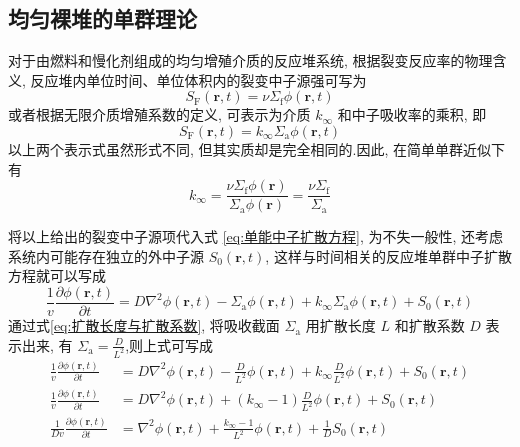\documentclass{Sichuan Normal University}
\begin{document}
\subsection{均匀裸堆的单群理论}
对于由燃料和慢化剂组成的均匀增殖介质的反应堆系统, 根据裂变反应率的物理含义, 反应堆内单位时间、单位体积内的裂变中子源强可写为
\begin{equation}
S_{\mathrm{F}}(\boldsymbol{r}, t)=\nu \Sigma_{\mathrm{f}} \phi(\boldsymbol{r}, t)
\end{equation}
或者根据无限介质增殖系数的定义, 可表示为介质 $k_{\infty}$ 和中子吸收率的乘积, 即
\begin{equation}
S_{\mathrm{F}}(\boldsymbol{r}, t)=k_{\infty} \Sigma_{\mathrm{a}} \phi(\boldsymbol{r}, t)
\end{equation}
以上两个表示式虽然形式不同, 但其实质却是完全相同的.因此, 在简单单群近似下有
\begin{equation}
k_{\infty}=\frac{\nu \Sigma_{\mathrm{f}} \phi(\boldsymbol{r})}{\Sigma_{\mathrm{a}} \phi(\boldsymbol{r})}=\frac{\nu \Sigma_{\mathrm{f}}}{\Sigma_{\mathrm{a}}}
\end{equation}

将以上给出的裂变中子源项代入式 \eqref{eq:单能中子扩散方程}, 为不失一般性, 还考虑系统内可能存在独立的外中子源 $S_0(\boldsymbol{r}, t)$, 这样与时间相关的反应堆单群中子扩散方程就可以写成
\begin{equation}
\frac{1}{v} \frac{\partial \phi(\boldsymbol{r}, t)}{\partial t}=D \nabla^2 \phi(\boldsymbol{r}, t)-\Sigma_{\mathrm{a}} \phi(\boldsymbol{r}, t)+k_{\infty} \Sigma_{\mathrm{a}} \phi(\boldsymbol{r}, t)+S_0(\boldsymbol{r}, t)
\label{eq:均匀裸堆的单群扩散方程42}
\end{equation}
通过式\eqref{eq:扩散长度与扩散系数}, 将吸收截面 $\Sigma_{\mathrm{a}}$ 用扩散长度 $L$ 和扩散系数 $D$ 表示出来, 有 $\Sigma_{\mathrm{a}}=\frac{D}{L^2}$,则上式可写成
\begin{align}
    \frac{1}{v} \frac{\partial \phi(\boldsymbol{r}, t)}{\partial t}&=D \nabla^2 \phi(\boldsymbol{r}, t)-\frac{D}{L^2} \phi(\boldsymbol{r}, t)+k_{\infty} \frac{D}{L^2} \phi(\boldsymbol{r}, t)+S_0(\boldsymbol{r}, t)\\
    \frac{1}{v} \frac{\partial \phi(\boldsymbol{r}, t)}{\partial t}&=D \nabla^2 \phi(\boldsymbol{r}, t)+\left(k_{\infty}-1\right) \frac{D}{L^2} \phi(\boldsymbol{r}, t)+S_0(\boldsymbol{r}, t)\\
    \frac{1}{Dv} \frac{\partial \phi(\boldsymbol{r}, t)}{\partial t}&=\nabla^2 \phi(\boldsymbol{r}, t)+\frac{k_{\infty}-1}{L^2} \phi(\boldsymbol{r}, t)+\frac{1}{D}S_0(\boldsymbol{r}, t)
    \label{eq:均匀裸堆的单群扩散方程1110}
\end{align}
\end{document}
